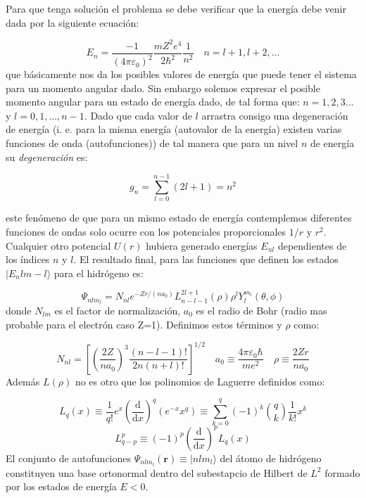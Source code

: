 \documentclass[12pt,a4paper]{article}
\numberwithin{equation}{section}
\numberwithin{figure}{section}
\newcommand{\parentesis}[1]{\left( #1  \right)}
\newcommand{\ccorchetes}[1]{\left[ #1  \right]}
\newcommand{\D}{\mathrm{d}}
\newcommand{\derivadas}[2]{\frac{\D #1}{\D #2}}
\newcommand{\rn}{\mathbf{r}}
\begin{document}
Para que tenga solución el problema se debe verificar que la energía debe venir dada por la siguiente ecuación:

\begin{equation}
E_n = \dfrac{-1}{(4 \pi \varepsilon_0)^2} \dfrac{m Z^2 e^4}{2 \hbar^2} \dfrac{1}{n^2} \quad n = l+1, l+2,...
\end{equation}
que básicamente nos da los posibles valores de energía que puede tener el sistema para un momento angular dado. Sin embargo solemos expresar el posible momento angular para un estado de energía dado, de tal forma que: $n=1,2,3...$ y $l=0,1,...,n-1$. Dado que cada valor de $l$ arrastra consigo una degeneración de energía (i. e. para la misma energía (autovalor de la energía) existen varias funciones de onda (autofunciones)) de tal manera que para un nivel $n$ de energía su \textit{degeneración} es:

\begin{equation}
g_n = \sum_{l=0}^{n-1} (2l+1) = n^2
\end{equation}

este fenómeno de que para un mismo estado de energía contemplemos diferentes funciones de ondas solo ocurre con los potenciales proporcionales $1/r$ y $r^2$. Cualquier otro potencial $U(r)$ hubiera generado energías $E_{nl}$ dependientes de los índices $n$ y $l$. El resultado final, para las funciones que definen los estados $| E_n l m-l \rangle$ para el hidrógeno es:

\begin{equation}
\Psi_{n l m_l} = N_{nl} e^{- Z r / (n a_0)} L^{2l+1}_{n-l-1} (\rho) \rho^{l} Y_l^{m_l} (\theta, \phi)
\end{equation}
donde $N_{lm}$ es el factor de normalización, $a_0$ es el radio de Bohr (radio mas probable para el electrón caso Z=1). Definimos estos términos y $\rho$ como:

\begin{equation}
N_{nl} = \ccorchetes{\parentesis{\dfrac{2Z}{n a_0}}^3\dfrac{(n-l-1)!}{2n (n+l)!}}^{1/2} \quad a_0 \equiv \dfrac{4 \pi \varepsilon_0 \hbar}{m e^2} \quad \rho \equiv \dfrac{2 Z r}{n a_0}
\end{equation}
Además $L(\rho)$ no es otro que los polinomios de Laguerre definidos como:

\begin{equation}
 L_q (x) \equiv \dfrac{1}{q!} e^x \parentesis{\derivadas{}{x}}^q (e^{-x} x^q ) \equiv \sum_{k=0}^{q} (-1)^k  \binom{q}{k} \dfrac{1}{k!} x^k
\end{equation}
\begin{equation}
L_{q-p}^{p} \equiv (-1)^p \parentesis{\derivadas{}{x}}^p L_q(x) 
\end{equation}
El conjunto de autofunciones $\Psi_{n l m_l} (\rn ) \equiv | n l m_l \rangle$ del átomo de hidrógeno constituyen una base ortonormal dentro del subestapcio de Hilbert de $L^2$ formado por los estados de energía $E<0$.
\end{document}

